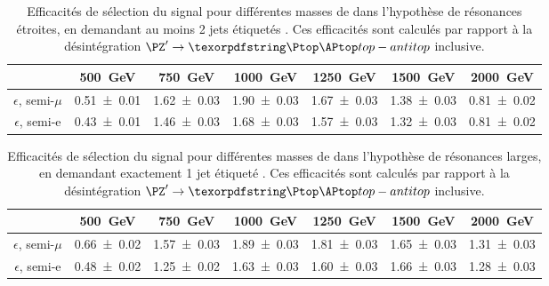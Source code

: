 \begin{table}[p!] \centering
  \begin{tabular}{ccccccc} \toprule
    & \SI{500}{\GeV} & \SI{750}{\GeV} & \SI{1000}{\GeV} & \SI{1250}{\GeV} & \SI{1500}{\GeV} & \SI{2000}{\GeV} \\ \midrule
    $\epsilon$, semi-$\mu$ & \num{0.51 \pm 0.01} & \num{1.62 \pm 0.03} & \num{1.90 \pm 0.03} & \num{1.67 \pm 0.03} & \num{1.38 \pm 0.03} & \num{0.81 \pm 0.02} \\
    $\epsilon$, semi-e & \num{0.43 \pm 0.01} & \num{1.46 \pm 0.03} & \num{1.68 \pm 0.03} & \num{1.57 \pm 0.03} & \num{1.32 \pm 0.03} & \num{0.81 \pm 0.02} \\ \bottomrule
  \end{tabular}
  \caption{Efficacités de sélection du signal pour différentes masses de \zprime dans l'hypothèse de résonances étroites, en demandant au moins 2 jets étiquetés \Pbottom. Ces efficacités sont calculés par rapport à la désintégration $\zprime \rightarrow \ttbar$ inclusive.}
  \label{tab:eff_narrow_2b}
\end{table}

\begin{table}[p!] \centering
  \begin{tabular}{ccccccc} \toprule
    & \SI{500}{\GeV} & \SI{750}{\GeV} & \SI{1000}{\GeV} & \SI{1250}{\GeV} & \SI{1500}{\GeV} & \SI{2000}{\GeV} \\ \midrule
    $\epsilon$, semi-$\mu$ & \num{0.66 \pm 0.02} & \num{1.57 \pm 0.03} & \num{1.89 \pm 0.03} & \num{1.81 \pm 0.03} & \num{1.65 \pm 0.03} & \num{1.31 \pm 0.03} \\
    $\epsilon$, semi-e & \num{0.48 \pm 0.02} & \num{1.25 \pm 0.02} & \num{1.63 \pm 0.03} & \num{1.60 \pm 0.03} & \num{1.66 \pm 0.03} & \num{1.28 \pm 0.03} \\ \bottomrule
  \end{tabular}
  \caption{Efficacités de sélection du signal pour différentes masses de \zprime dans l'hypothèse de résonances larges, en demandant exactement 1 jet étiqueté \Pbottom. Ces efficacités sont calculés par rapport à la désintégration $\zprime \rightarrow \ttbar$ inclusive.}
  \label{tab:eff_large_1b}
\end{table}

